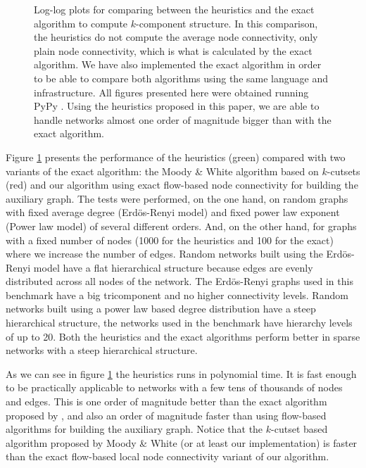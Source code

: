 \begin{figure}[h]
\begin{minipage}{\textwidth}
\caption[Loglog plots for comparing between heuristics and exact algorithms]{Log-log plots for comparing between the heuristics and the exact algorithm to compute $k$-component structure. In this comparison, the heuristics do not compute the average node connectivity, only plain node connectivity, which is what is calculated by the exact algorithm. We have also implemented the exact algorithm in order to be able to compare both algorithms using the same language and infrastructure. All figures presented here were obtained running PyPy \citep{bolz:2009}. Using the heuristics proposed in this paper, we are able to handle networks almost one order of magnitude bigger than with the exact algorithm.}
\label{fig:performance}
\end{minipage}
\end{figure}

Figure \ref{fig:performance} presents the performance of the heuristics (green) compared with two variants of the exact algorithm: the Moody \& White algorithm based on $k$-cutsets (red) and our algorithm using exact flow-based node connectivity for building the auxiliary graph. The tests were performed, on the one hand, on random graphs with fixed average degree (Erdös-Renyi model) and fixed power law exponent (Power law model) of several different orders. And, on the other hand, for graphs with a fixed number of nodes (1000 for the heuristics and 100 for the exact) where we increase the number of edges. Random networks built using the Erdös-Renyi model have a flat hierarchical structure because edges are evenly distributed across all nodes of the network. The Erdös-Renyi graphs used in this benchmark have a big tricomponent and no higher connectivity levels. Random networks built using a power law based degree distribution have a steep hierarchical structure, the networks used in the benchmark have hierarchy levels of up to 20. Both the heuristics and the exact algorithms perform better in sparse networks with a steep hierarchical structure.

As we can see in figure \ref{fig:performance} the heuristics runs in polynomial time. It is fast enough to be practically applicable to networks with a few tens of thousands of nodes and edges. This is one order of magnitude better than the exact algorithm proposed by \citet{moody:2003}, and also an order of magnitude faster than using flow-based algorithms for building the auxiliary graph. Notice that the $k$-cutset based algorithm proposed by Moody \& White (or at least our implementation) is faster than the exact flow-based local node connectivity variant of our algorithm.

